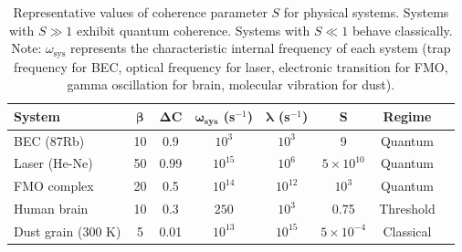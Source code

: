 \documentclass[12pt,a4paper]{article}
\begin{document}
\begin{table}[h]
\centering
\begin{tabular}{lccccccc}
\toprule
\textbf{System} & $\boldsymbol{\beta}$ & $\boldsymbol{\Delta C}$ & $\boldsymbol{\omega_{sys}}$ (s$^{-1}$) & $\boldsymbol{\lambda}$ (s$^{-1}$) & $\boldsymbol{S}$ & \textbf{Regime} \\
\midrule
BEC (87Rb) & 10 & 0.9 & $10^3$ & $10^3$ & 9 & Quantum \\
Laser (He-Ne) & 50 & 0.99 & $10^{15}$ & $10^6$ & $5 \times 10^{10}$ & Quantum \\
FMO complex & 20 & 0.5 & $10^{14}$ & $10^{12}$ & $10^3$ & Quantum \\
Human brain & 10 & 0.3 & $250$ & $10^3$ & 0.75 & Threshold \\
Dust grain (300 K) & 5 & 0.01 & $10^{13}$ & $10^{15}$ & $5 \times 10^{-4}$ & Classical \\
\bottomrule
\end{tabular}
\caption{Representative values of coherence parameter $S$ for physical systems. Systems with $S \gg 1$ exhibit quantum coherence. Systems with $S \ll 1$ behave classically. Note: $\omega_{\text{sys}}$ represents the characteristic internal frequency of each system (trap frequency for BEC, optical frequency for laser, electronic transition for FMO, gamma oscillation for brain, molecular vibration for dust).}
\label{tab:s_values}
\end{table}
\end{document}
